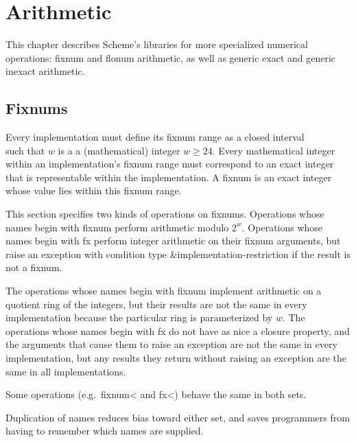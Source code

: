 \chapter{Arithmetic}
\label{numberchapter}

This chapter describes Scheme's libraries for more specialized
numerical operations: fixnum and flonum arithmetic, as well as generic
exact and generic inexact arithmetic.

\section{Fixnums}
\label{fixnumssection}

Every implementation must define its fixnum range as a closed
interval
%
\begin{displaymath}
[-2^{w-1}, 2^{w-1} - 1]
\end{displaymath}
%
such that $w$ is a a (mathematical) integer $w \geq 24$.  Every
mathematical integer within an implementation's fixnum range must
correspond to an exact integer that is representable within the
implementation.
A fixnum is an exact integer whose value lies within this
fixnum range.

This section specifies two kinds of operations on fixnums.  Operations
whose names begin with {\cf fixnum} perform arithmetic modulo
$2^{w}$.  Operations whose names begin with {\cf fx}
perform integer arithmetic on their fixnum arguments, but raise an
exception with condition type {\cf\&implementation-restriction} 
if the result is not a fixnum.

\begin{rationale}
The operations whose names begin with {\cf fixnum}
implement arithmetic on a quotient ring of the integers,
but their results are not the same in every implementation
because the particular ring is parameterized by $w$.
The operations whose names begin with {\cf fx} do
not have as nice a closure property, and the arguments that
cause them to raise an exception are not the same in every
implementation, but any results they return without
raising an exception are the same in all implementations.
\end{rationale}

Some operations (e.g.\ {\cf fixnum<} and {\cf fx<}) behave the same in
both sets.

\begin{rationale}
Duplication of names reduces bias toward either set,
and saves programmers from having to remember which
names are supplied.
\end{rationale}

